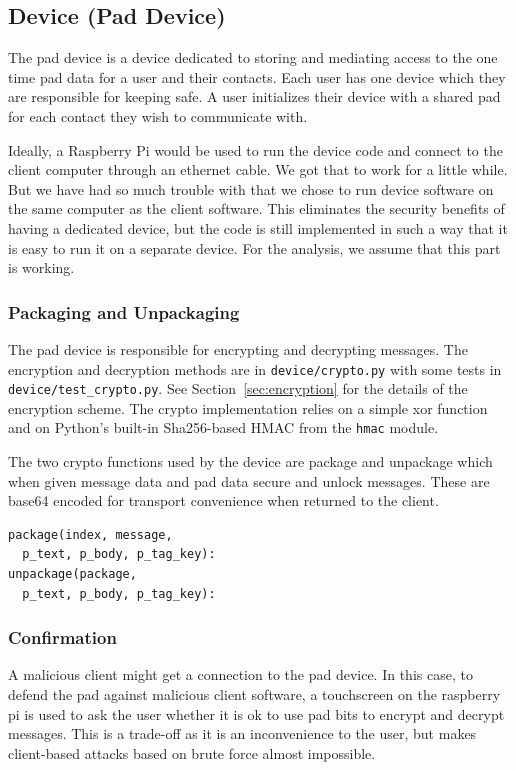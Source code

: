 \documentclass[twocolumn]{article}
\begin{document}
\subsection{Device (Pad Device)}
The pad device is a device dedicated to storing and mediating access to the one time pad data for a user and their contacts. Each user has one device which they are responsible for keeping safe. A user initializes their device with a shared pad for each contact they wish to communicate with.

Ideally, a Raspberry Pi would be used to run the device code and connect to the client computer through an ethernet cable. We got that to work for a little while. But we have had so much trouble with that we chose to run device software on the same computer as the client software. This eliminates the security benefits of having a dedicated device, but the code is still implemented in such a way that it is easy to run it on a separate device. For the analysis, we assume that this part is working.


\subsubsection{Packaging and Unpackaging}
The pad device is responsible for encrypting and decrypting messages. The encryption and decryption methods are in \texttt{device/crypto.py} with some tests in \texttt{device/test\_crypto.py}. See Section~\ref{sec:encryption} for the details of the encryption scheme. The crypto implementation relies on a simple xor function and on Python's built-in Sha256-based HMAC from the \texttt{hmac} module.

The two crypto functions used by the device are package and unpackage which when given message
data and pad data secure and unlock messages. These are base64 encoded for transport convenience when
returned to the client.

\begin{lstlisting}
package(index, message,
  p_text, p_body, p_tag_key):
unpackage(package,
  p_text, p_body, p_tag_key):
\end{lstlisting}

\subsubsection{Confirmation}
A malicious client might get a connection to the pad device. In this case, to defend the pad against malicious client software, a touchscreen on the raspberry pi is used to ask the user whether it is ok to use pad bits to encrypt and decrypt messages. This is a trade-off as it is an inconvenience to the user, but makes client-based attacks based on brute force almost impossible.
\end{document}
